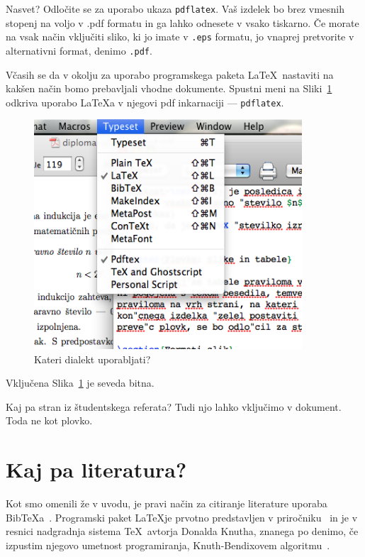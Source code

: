 \documentclass[a4paper, 12pt]{book}
\newcommand{\BibTeX}{{\sc Bib}\TeX}
\begin{document}
Nasvet? Odločite se za uporabo ukaza {\tt pdflatex}. Vaš izdelek bo brez vmesnih stopenj na voljo v {.pdf} formatu in ga lahko odnesete v vsako tiskarno. Če morate na vsak način vključiti sliko, ki jo imate v {\tt .eps} formatu, jo vnaprej pretvorite v alternativni format, denimo {\tt .pdf}.

Včasih se da v okolju za uporabo programskega paketa \LaTeX\ nastaviti na kakšen način bomo prebavljali vhodne dokumente. Spustni meni na Sliki~\ref{pic2} odkriva uporabo \LaTeX{}a v njegovi pdf inkarnaciji --- {\tt pdflatex}.
\begin{figure}
\begin{center}
\includegraphics[width=10cm]{pic2.png}
\end{center}
\caption{Kateri dialekt uporabljati?}
\label{pic2}
\end{figure}

Vključena Slika~\ref{pic2} je seveda bitna.

Kaj pa stran iz študentskega referata?\label{pp}
Tudi njo lahko vključimo v dokument. Toda ne kot plovko.



\chapter{Kaj pa literatura?}
\label{ch3}
Kot smo omenili že v uvodu, je pravi način za citiranje literature uporaba \BibTeX{}a~\cite{bib}.
Programski paket \LaTeX je prvotno predstavljen v priročniku~\cite{lat} in je v resnici nadgradnja sistema \TeX\ avtorja Donalda Knutha, znanega po denimo, če izpustim njegovo umetnost programiranja, Knuth-Bendixovem algoritmu~\cite{dk1}.
\end{document}
